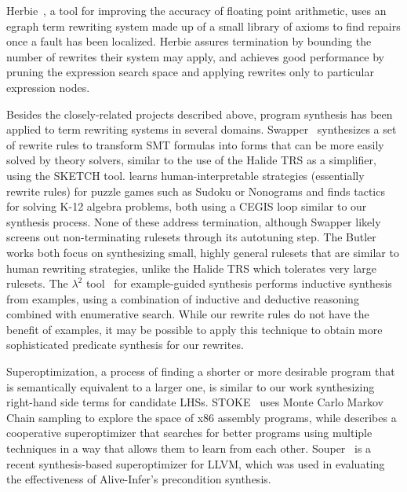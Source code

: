 Herbie~\cite{panchekha2015automatically}, a tool for improving the accuracy of floating point arithmetic, uses an egraph term rewriting system made up of a small library of axioms to find repairs once a fault has been localized. Herbie assures termination by bounding the number of rewrites their system may apply, and achieves good performance by pruning the expression search space and applying rewrites only to particular expression nodes. 

Besides the closely-related projects described above, program synthesis has been applied to term rewriting systems in several domains. Swapper~\cite{singh2016swapper} synthesizes a set of rewrite rules to transform SMT formulas into forms that can be more easily solved by theory solvers, similar to the use of the Halide TRS as a simplifier, using the SKETCH tool. \citet{butler2017synthesizing} learns human-interpretable strategies (essentially rewrite rules) for puzzle games such as Sudoku or Nonograms and \citet{butler2018framework} finds tactics for solving K-12 algebra problems, both using a CEGIS loop similar to our synthesis process. None of these address termination, although Swapper likely screens out non-terminating rulesets through its autotuning step. The Butler works both focus on synthesizing small, highly general rulesets that are similar to human rewriting strategies, unlike the Halide TRS which tolerates very large rulesets.  The \textbf{$\lambda^2$} tool~\cite{feser2015lambda} for example-guided synthesis performs inductive synthesis from examples, using a combination of inductive and deductive reasoning combined with enumerative search.  While our rewrite rules do not have the benefit of examples, it may be possible to apply this technique to obtain more sophisticated predicate synthesis for our rewrites.

Superoptimization, a process of finding a shorter or more desirable program that is semantically equivalent to a larger one, is similar to our work synthesizing right-hand side terms for candidate LHSs. STOKE~\cite{schkufza2013stochastic} uses Monte Carlo Markov Chain sampling to explore the space of x86 assembly programs, while \citet{phothilimthana2016scaling} describes a cooperative superoptimizer that searches for better programs using multiple techniques in a way that allows them to learn from each other.  Souper~\cite{sasnauskas2017souper} is a recent synthesis-based superoptimizer for LLVM, which was used in evaluating the effectiveness of Alive-Infer's{} precondition synthesis.

